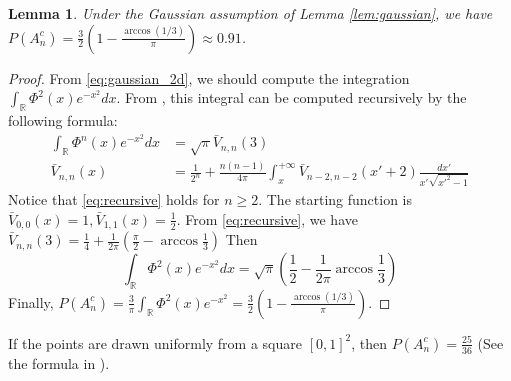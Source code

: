 \documentclass{article}
\newtheorem{lemma}{Lemma}
\begin{document}
\begin{lemma}
    Under the Gaussian assumption of
    Lemma \ref{lem:gaussian},
    we have $P(A_n^c)=\frac{3}{2}
    (1-\frac{\arccos(1/3)}{\pi})
    \approx 0.91$.
\end{lemma}
\begin{proof}
From  \eqref{eq:gaussian_2d},
we should compute the integration
$\int_{\mathbb{R}} \Phi^2(x)e^{-x^2}
dx$.
From \cite{ruben1954moments},
this integral can be computed recursively
by the following formula:
\begin{align}
    \int_{\mathbb{R}} \Phi^n(x)e^{-x^2}
    dx &= \sqrt{\pi} \bar{V}_{n,n}(3) \\
    \bar{V}_{n,n}(x)
    &=\frac{1}{2^n}
    + \frac{n(n-1)}{4\pi}
    \int_{x}^{+\infty}
    \bar{V}_{n-2,n-2}(x'+2)
    \frac{dx'}{x'\sqrt{x'^2-1}}
    \label{eq:recursive}
\end{align}
Notice that \eqref{eq:recursive}
holds for $n\geq 2$. The starting
function is $\bar{V}_{0,0}(x)=1
,\bar{V}_{1,1}(x)=\frac{1}{2}$.
From \eqref{eq:recursive},
we have $\bar{V}_{n,n}(3)=
\frac{1}{4} + \frac{1}{2\pi}
(\frac{\pi}{2} - \arccos\frac{1}{3})
$
Then
\begin{equation}
\int_{\mathbb{R}} \Phi^2(x)e^{-x^2}
dx = \sqrt{\pi}(\frac{1}{2} - \frac{1}{2\pi}\arccos\frac{1}{3})
\end{equation}
Finally,
$P(A_n^c)=\frac{3}{\pi}
\int_{\mathbb{R}} \Phi^2(x)e^{-x^2}
=\frac{3}{2}
(1-\frac{\arccos(1/3)}{\pi})
$.
\end{proof}
If the points are drawn uniformly
from a square $[0,1]^2$, then
$P(A_n^c)=\frac{25}{36}$
(See the formula in \cite{valtr1995probability}).
\end{document}
